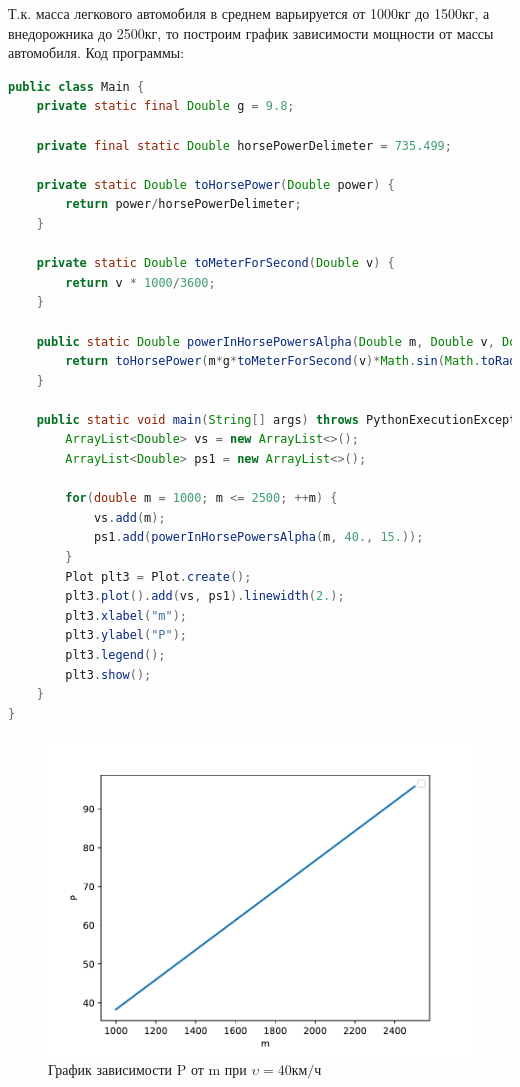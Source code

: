 \documentclass[a4paper, 14pt]{extarticle}
\begin{document}
\begin{enumerate}
					Т.к. масса легкового автомобиля в среднем варьируется от 1000кг до 1500кг, а внедорожника до 2500кг, то построим график зависимости мощности от массы автомобиля.
					Код программы:
					\begin{lstlisting}[language=Java]
public class Main {
	private static final Double g = 9.8;
	
	private final static Double horsePowerDelimeter = 735.499;
	
	private static Double toHorsePower(Double power) {
		return power/horsePowerDelimeter;
	}
	
	private static Double toMeterForSecond(Double v) {
		return v * 1000/3600;
	}
	
	public static Double powerInHorsePowersAlpha(Double m, Double v, Double alpha) {
		return toHorsePower(m*g*toMeterForSecond(v)*Math.sin(Math.toRadians(alpha)));
	}
	
	public static void main(String[] args) throws PythonExecutionException, IOException {
		ArrayList<Double> vs = new ArrayList<>();
		ArrayList<Double> ps1 = new ArrayList<>();
		
		for(double m = 1000; m <= 2500; ++m) {
			vs.add(m);
			ps1.add(powerInHorsePowersAlpha(m, 40., 15.));
		}
		Plot plt3 = Plot.create();
		plt3.plot().add(vs, ps1).linewidth(2.);
		plt3.xlabel("m");
		plt3.ylabel("P");
		plt3.legend();
		plt3.show();
	}
}
					\end{lstlisting}
					\begin{figure}[H]
						\centering
						\includegraphics[width = \linewidth]{fig2.pdf}
						\caption[.] {График зависимости P от m при \( \upsilon = 40 \text{км}/\text{ч} \)}
					\end{figure}
			\end{enumerate}
		\pagebreak
\end{document}
